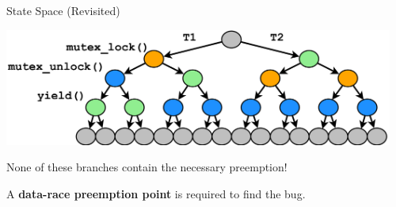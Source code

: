 \documentclass[xcolor=dvipsnames]{beamer}
\begin{document}
\begin{frame}{State Space (Revisited)}
	\begin{center}
		\includegraphics[width=0.96\textwidth]{../../oopsla/tree-maximal-only.pdf}
		\linegap

		None of these branches contain the necessary preemption!
		\linegap

		A {\bf data-race preemption point} is required to find the bug.
	\end{center}
\end{frame}
\end{document}
